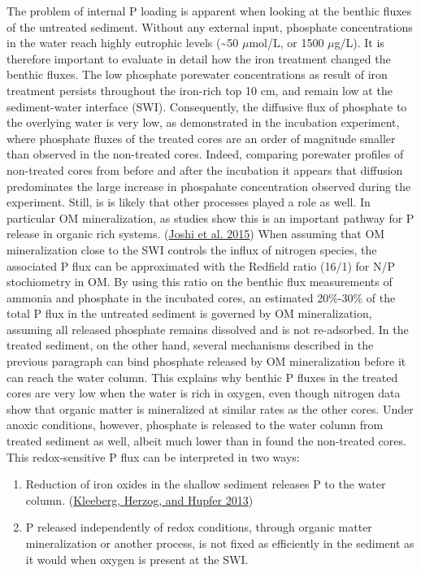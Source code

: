 \documentclass[a4paper,11pt]{article}
\begin{document}
The problem of internal P loading is apparent when looking at the benthic fluxes of the untreated sediment. Without any external input, phosphate concentrations in the water reach highly eutrophic levels (\textasciitilde50 \(\mu\)mol/L, or 1500 \(\mu\)g/L). It is therefore important to evaluate in detail how the iron treatment changed the benthic fluxes. The low phosphate porewater concentrations as result of iron treatment persists throughout the iron-rich top 10 cm, and remain low at the sediment-water interface (SWI). Consequently, the diffusive flux of phosphate to the overlying water is very low, as demonstrated in the incubation experiment, where phosphate fluxes of the treated cores are an order of magnitude smaller than observed in the non-treated cores. Indeed, comparing porewater profiles of non-treated cores from before and after the incubation it appears that diffusion predominates the large increase in phospahate concentration observed during the experiment. Still, is is likely that other processes played a role as well. In particular OM mineralization, as studies show this is an important pathway for P release in organic rich systems. (\protect\hyperlink{ref-joshiOrganicMatterRemineralization2015}{Joshi et al. 2015}) When assuming that OM mineralization close to the SWI controls the influx of nitrogen species, the associated P flux can be approximated with the Redfield ratio (16/1) for N/P stochiometry in OM. By using this ratio on the benthic flux measurements of ammonia and phosphate in the incubated cores, an estimated 20\%-30\% of the total P flux in the untreated sediment is governed by OM mineralization, assuming all released phosphate remains dissolved and is not re-adsorbed. In the treated sediment, on the other hand, several mechanisms described in the previous paragraph can bind phosphate released by OM mineralization before it can reach the water column. This explains why benthic P fluxes in the treated cores are very low when the water is rich in oxygen, even though nitrogen data show that organic matter is mineralized at similar rates as the other cores. Under anoxic conditions, however, phosphate is released to the water column from treated sediment as well, albeit much lower than in found the non-treated cores. This redox-sensitive P flux can be interpreted in two ways:
\begin{enumerate}
\def\labelenumi{\arabic{enumi}.}
\item
  Reduction of iron oxides in the shallow sediment releases P to the water column. (\protect\hyperlink{ref-kleebergRedoxSensitivityIron2013}{Kleeberg, Herzog, and Hupfer 2013})
\item
  P released independently of redox conditions, through organic matter mineralization or another process, is not fixed as efficiently in the sediment as it would when oxygen is present at the SWI.
\end{enumerate}
\end{document}
